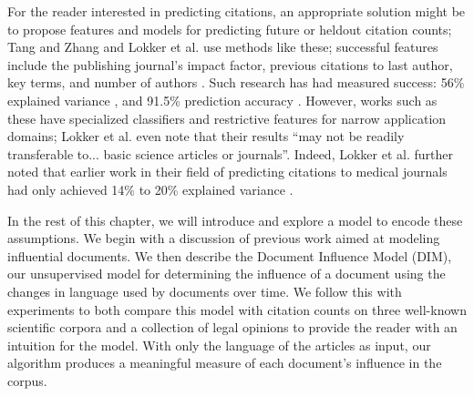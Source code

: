 For the reader interested in predicting citations, an appropriate
solution might be to propose features and models for predicting future
or heldout citation counts; Tang and Zhang \cite{tang:2009} and Lokker
et al. \cite{lokker:2008} use methods like these; successful features
include the publishing journal's impact factor, previous citations to
last author, key terms, and number of authors
\cite{tang:2009,lokker:2008}.  Such research has had measured success:
56\% explained variance \cite{lokker:2008}, and 91.5\% prediction
accuracy \cite{ibanez:2009}.  However, works such as these have
specialized classifiers and restrictive features for narrow
application domains; Lokker et al. \cite{lokker:2008} even note that
their results ``may not be readily transferable to... basic science
articles or journals''. Indeed, Lokker et al.  further noted that
earlier work in their field of predicting citations to medical
journals had only achieved 14\% to 20\% explained variance
\cite{lokker:2008}.



In the rest of this chapter, we will introduce and explore a model to
encode these assumptions.  We begin with a discussion of previous work
aimed at modeling influential documents.  We then describe the
Document Influence Model (DIM), our unsupervised model for determining
the influence of a document using the changes in language used by
documents over time.  We follow this with experiments to both compare
this model with citation counts on three well-known scientific corpora
and a collection of legal opinions to provide the reader with an
intuition for the model. With only the language of the
articles as input, our algorithm produces a meaningful measure of each
document's influence in the corpus.
